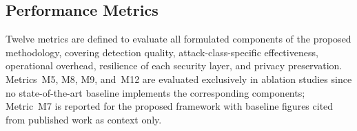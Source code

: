 \documentclass[12pt, a4paper]{report}
\begin{document}
{{%

\subsection{Performance Metrics}
\label{sec:metrics}

Twelve metrics are defined to evaluate all formulated
components of the proposed methodology, covering detection
quality, attack-class-specific effectiveness, operational
overhead, resilience of each security layer, and privacy
preservation. Metrics~M5, M8, M9, and~M12 are evaluated
exclusively in ablation studies since no state-of-the-art
baseline implements the corresponding components; Metric~M7
is reported for the proposed framework with baseline figures
cited from published work as context only.

}}
\end{document}

